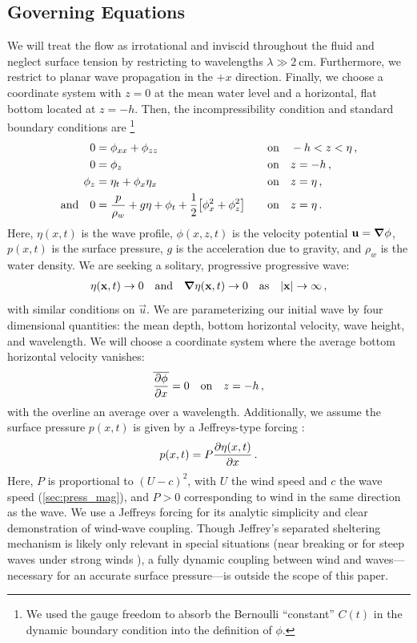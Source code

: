 \documentclass{jfm}
\begin{document}
\subsection{Governing Equations}
We will treat the flow as irrotational and inviscid throughout the
fluid and neglect surface tension by restricting to wavelengths $\lambda
\gg \SI{2}{\centi\meter}$.
Furthermore, we restrict to planar wave propagation in the $+x$
direction.
Finally, we choose a coordinate system with $z=0$ at the mean water level and
a horizontal, flat bottom located at $z=-h$.
Then, the incompressibility condition and standard boundary conditions
are%
\footnote{
  We used the gauge freedom to absorb the Bernoulli ``constant'' $C(t)$
  in the dynamic boundary condition into the definition of $\phi$.
}
\begin{alignat}{2}
  0 &= \phi_{xx} + \phi_{zz} &&\qq{on}
  -h < z < \eta \,, \label{eq:laplace}\\
  0 &= \phi_{z} &&\qq{on} z=-h \,, \label{eq:bottom_bc}\\
  \phi_{z} &= \eta_{t} + \phi_{x} \eta_{x} &&\qq{on} z = \eta \,,
  \label{eq:kinematic_bc}\\
  \qq*{and} 0 &= \frac{p}{\rho_w} + g\eta + \phi_{t} +
  \frac{1}{2} \bqty{\phi_{x}^2 + \phi_{z}^2} &&\qq{on} z=
  \eta \,. \label{eq:dynamic_bc}
\end{alignat}
Here, $\eta(x,t)$ is the wave profile, $\phi(x,z,t)$ is the velocity
potential $\mathbf{\bm{u}} = \grad{\phi}$, $p(x,t)$ is the surface pressure,
$g$ is the acceleration due to gravity, and $\rho_w$ is the water
density.
We are seeking a solitary, progressive progressive wave:
\begin{gather}
  \eta(\vec{x},t) \to 0 \qq{and} \grad{\eta(\vec{x},t)} \to 0 \qq{as}
  \abs{\vec{x}} \to \infty \,,
\end{gather}
with similar conditions on $\vec{u}$.
We are parameterizing our initial wave by four dimensional quantities:
the mean depth, bottom horizontal velocity, wave height, and wavelength.
We will choose a coordinate system where the average bottom horizontal
velocity vanishes:
\begin{equation}
  \overline{ \pdv{\phi}{x} } = 0 \qq{on} z=-h \,,
  \label{eq:bot_bc_horz}
\end{equation}
with the overline an average over a wavelength.
Additionally, we assume the surface pressure $p(x,t)$ is given by a
Jeffreys-type forcing \citep{jeffreys1925formation}:
\begin{equation}
  p(x,t) = P \pdv{\eta(x,t)}{x} \,.
\end{equation}
Here, $P$ is proportional to $(U-c)^2$, with $U$ the wind speed and $c$
the wave speed (\cf \cref{sec:press_mag}), and $P>0$ corresponding to wind in
the same direction as the wave.
We use a Jeffreys forcing for its analytic simplicity and clear
demonstration of wind-wave coupling.
Though Jeffrey's separated sheltering mechanism is likely only relevant
in special situations (\eg near breaking \citealp{banner1976separation}
or for steep waves under strong winds
\citealp{tian2013evolution,touboul2006interaction}),
a fully dynamic coupling between wind and waves---necessary for an
accurate surface pressure---is outside the scope of this paper.
\end{document}
